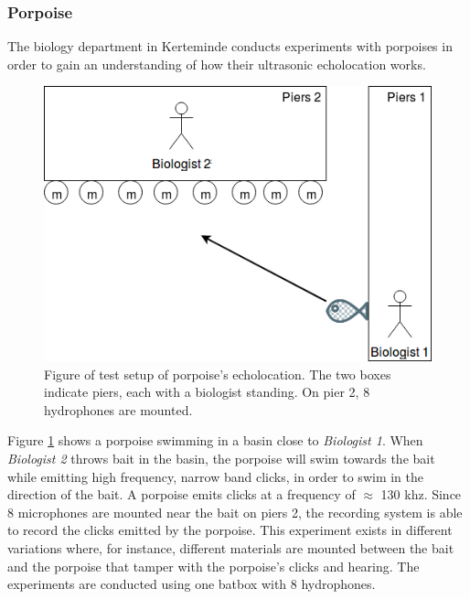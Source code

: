 \subsubsection{Porpoise}
The biology department in Kerteminde conducts experiments with porpoises in order to gain an understanding of how their ultrasonic echolocation works.
\begin{figure}[!h]
    \centering
	\includegraphics[width=\textwidth]{figures/porpoise_experiment1}
	\caption{Figure of test setup of porpoise's echolocation. The two boxes indicate piers, each with a biologist standing. On pier 2, 8 hydrophones are mounted.}\label{usecase:porpoise_experiment1}
\end{figure}


Figure \ref{usecase:porpoise_experiment1} shows a porpoise swimming in a basin close to \textit{Biologist 1}.
When \textit{Biologist 2} throws bait in the basin, the porpoise will swim towards the bait while emitting high frequency, narrow band clicks, in order to swim in the direction of the bait. A porpoise emits clicks at a frequency of $\approx$ 130 khz.
Since 8 microphones are mounted near the bait on piers 2, the recording system is able to record the clicks emitted by the porpoise. This experiment exists in different variations where, for instance, different materials are mounted between the bait and the porpoise that tamper with the porpoise's clicks and hearing. The experiments are conducted using one batbox with 8 hydrophones.

